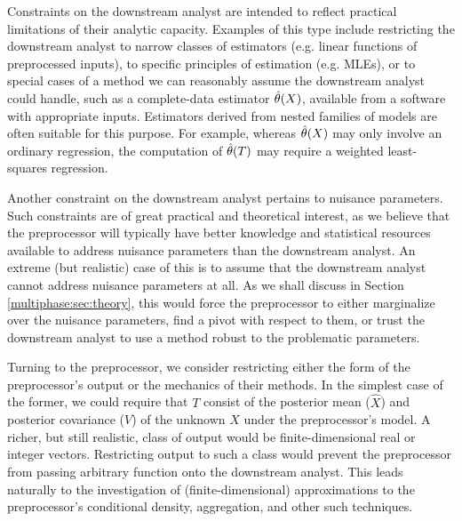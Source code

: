 Constraints on the downstream analyst are intended to reflect practical limitations of their analytic capacity.
Examples of this type include restricting the downstream analyst to narrow classes of estimators (e.g. linear functions of preprocessed inputs), to specific principles of estimation (e.g. MLEs), or to special cases of a method we can reasonably assume the downstream analyst could handle, such as a complete-data estimator $\hat{\theta}(X)$, available from  a software with appropriate inputs.
Estimators derived from nested families of models are often suitable for this purpose.
For example, whereas $\hat{\theta}(X)$ may only involve an  ordinary  regression, the computation of  $\hat{\theta}(T)$ may require  a weighted least-squares regression.

Another constraint on the downstream analyst pertains to nuisance parameters.
Such constraints are of great practical and theoretical interest, as we believe that the preprocessor will typically have better knowledge and statistical resources available to address nuisance parameters than the downstream analyst.
An extreme (but realistic) case of this is to assume that the downstream analyst cannot address nuisance parameters at all.
As we shall discuss in Section \ref{multiphase:sec:theory}, this would force the preprocessor to either marginalize over the nuisance parameters, find a pivot with respect to them, or trust the downstream analyst to use a method robust to the problematic parameters.

Turning to the preprocessor, we consider restricting either the form of the preprocessor's output or the mechanics of their methods.
In the simplest case of the former, we could require that $T$ consist of the posterior mean ($\hat{X}$) and posterior covariance ($V$) of the unknown $X$ under the preprocessor's model.
A richer, but still realistic, class of output would be finite-dimensional real or integer vectors.
Restricting output to such a class would prevent the preprocessor from passing arbitrary function onto the downstream analyst.
This leads naturally to the investigation of (finite-dimensional) approximations to the preprocessor's conditional density, aggregation, and other such techniques.

